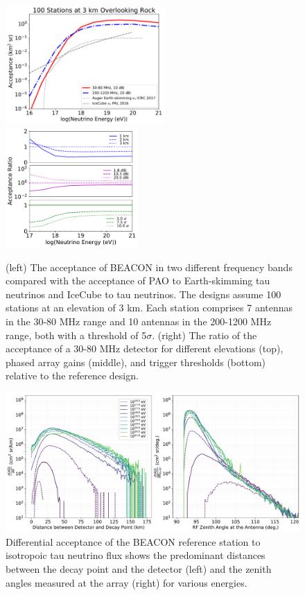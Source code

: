 \documentclass[12pt]{article}
\begin{document}
\begin{figure}[hbtp]
\begin{center}
\includegraphics[width=0.54\textwidth]{figures/acceptance_100stations_energyssampling}
\includegraphics[width=0.45\textwidth]{figures/acceptanceratio_100stations_energyssampling_study}
\caption{(left) The acceptance of BEACON in two different frequency bands compared with the acceptance of PAO to Earth-skimming tau neutrinos and IceCube to tau neutrinos. The designs assume 100 stations at an elevation of 3 km. Each station comprises 7 antennas in the 30-80 MHz range and 10 antennas in the 200-1200 MHz range, both with a threshold of 5$\sigma$. (right) The ratio of the acceptance of a 30-80 MHz detector for different elevations (top), phased array gains (middle), and trigger thresholds (bottom) relative to the reference design. }
\label{fig:acceptance}
\end{center}
\end{figure}

\begin{figure}[tbhp]
\begin{center}
\includegraphics[width=\textwidth]{figures/diffacceptance_30-80MHz_refdesign}
\caption{Differential acceptance of the BEACON reference station to isotropoic tau neutrino flux shows the predominant distances between the decay point and the detector (left) and the zenith angles measured at the array (right) for various energies.}
\label{fig:diffaccep}
\end{center}
\end{figure}
\end{document}
